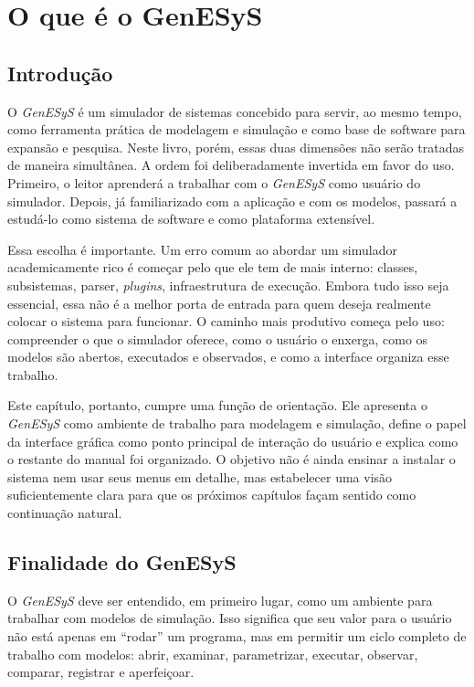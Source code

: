 \chapter{O que é o GenESyS}
\label{chap:o_que_e_o_genesys}

\section{Introdução}
\label{sec:cap1_introducao}

O \textit{GenESyS} é um simulador de sistemas concebido para servir, ao mesmo tempo, como ferramenta prática de modelagem e simulação e como base de software para expansão e pesquisa. Neste livro, porém, essas duas dimensões não serão tratadas de maneira simultânea. A ordem foi deliberadamente invertida em favor do uso. Primeiro, o leitor aprenderá a trabalhar com o \textit{GenESyS} como usuário do simulador. Depois, já familiarizado com a aplicação e com os modelos, passará a estudá-lo como sistema de software e como plataforma extensível.

Essa escolha é importante. Um erro comum ao abordar um simulador academicamente rico é começar pelo que ele tem de mais interno: classes, subsistemas, parser, \textit{plugins}, infraestrutura de execução. Embora tudo isso seja essencial, essa não é a melhor porta de entrada para quem deseja realmente colocar o sistema para funcionar. O caminho mais produtivo começa pelo uso: compreender o que o simulador oferece, como o usuário o enxerga, como os modelos são abertos, executados e observados, e como a interface organiza esse trabalho.

Este capítulo, portanto, cumpre uma função de orientação. Ele apresenta o \textit{GenESyS} como ambiente de trabalho para modelagem e simulação, define o papel da interface gráfica como ponto principal de interação do usuário e explica como o restante do manual foi organizado. O objetivo não é ainda ensinar a instalar o sistema nem usar seus menus em detalhe, mas estabelecer uma visão suficientemente clara para que os próximos capítulos façam sentido como continuação natural.

\section{Finalidade do GenESyS}
\label{sec:cap1_finalidade}

O \textit{GenESyS} deve ser entendido, em primeiro lugar, como um ambiente para trabalhar com modelos de simulação. Isso significa que seu valor para o usuário não está apenas em ``rodar'' um programa, mas em permitir um ciclo completo de trabalho com modelos: abrir, examinar, parametrizar, executar, observar, comparar, registrar e aperfeiçoar.

